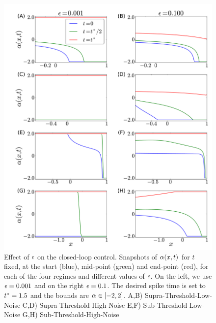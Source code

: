 \begin{figure}[htp] 
\begin{center} 
  \includegraphics[width=\textwidth]{Figs/HJB/Regimes_eps_comparison.pdf} 
  \caption[labelInTOC]{Effect of ${\epsilon}$ on the closed-loop control. Snapshots of 
  ${\alpha}(x,t)$ for $t$ fixed, at the start (blue), mid-point (green) and end-point 
  (red), for each of the four regimes and different values of ${\epsilon}$. 
  On the left, we use ${\epsilon} = 0.001$ and on the right ${\epsilon} = 0.1$. 
  The desired spike time is set to 
  ${ t^* }=1.5$ and the bounds are ${\alpha} \in [-2,2]$.  
  A,B) 
   Supra-Threshold-Low-Noise  
  C,D)  
   Supra-Threshold-High-Noise  
  E,F) 
   Sub-Threshold-Low-Noise  
  G,H) 
   Sub-Threshold-High-Noise} 
\label{fig:HJB_4regimes_control_different_eps}  
\end{center} 
\end{figure} 
